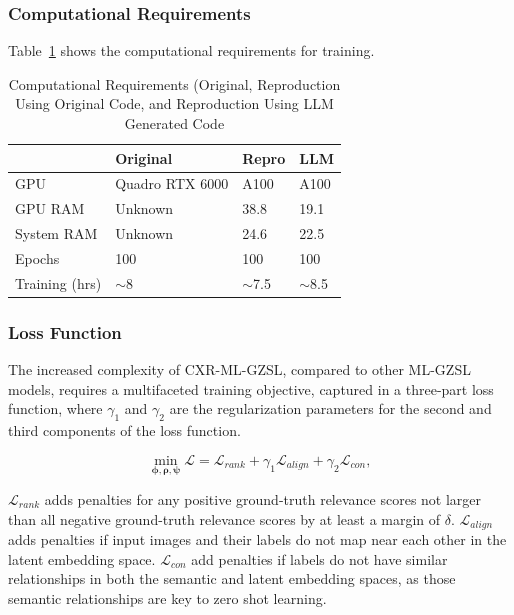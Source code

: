 \documentclass[letterpaper]{article} %
\begin{document}
\subsubsection{Computational Requirements}

Table~\ref{tab:compute} shows the computational requirements for training.

\begin{table}[h!]
\centering
\begin{tabular}{|l|l|l|l|}
\hline
\textbf{} & \textbf{Original} & \textbf{Repro} & \textbf{LLM} \\
\hline
GPU & Quadro RTX 6000 & A100 & A100 \\
GPU RAM & Unknown & 38.8 & 19.1 \\
System RAM & Unknown & 24.6 & 22.5 \\
Epochs & 100 & 100 & 100 \\
Training (hrs) & $\sim$8 & $\sim$7.5 & $\sim$8.5 \\
\hline
\end{tabular}
\caption{Computational Requirements (Original, Reproduction Using Original Code, and Reproduction Using LLM Generated Code}
\label{tab:compute}
\end{table}

\subsubsection{Loss Function}

The increased complexity of CXR-ML-GZSL, compared to other ML-GZSL models, requires a multifaceted training objective, captured in a three-part loss function, where $\gamma_1$ and $\gamma_2$ are the regularization parameters for the second and third components of the loss function.

\begin{equation}
    \min_{\boldsymbol{\phi} ,\boldsymbol{\rho} ,\boldsymbol{\psi}} \mathcal{L} = \mathcal{L}_{{rank}} +\gamma_{1} \mathcal{L}_{align} +\gamma_{2} \mathcal{L}_{con},
    \label{eqn:full_loss}
\end{equation}

\texorpdfstring{$\mathcal{L}_{rank}$}: adds penalties for any positive ground-truth relevance scores not larger than all negative ground-truth relevance scores by at least a margin of $\delta$. \texorpdfstring{$\mathcal{L}_{align}$}: adds penalties if input images and their labels do not map near each other in the latent embedding space. \texorpdfstring{$\mathcal{L}_{con}$}: add penalties if labels do not have similar relationships in both the semantic and latent embedding spaces, as those semantic relationships are key to zero shot learning.
\end{document}
